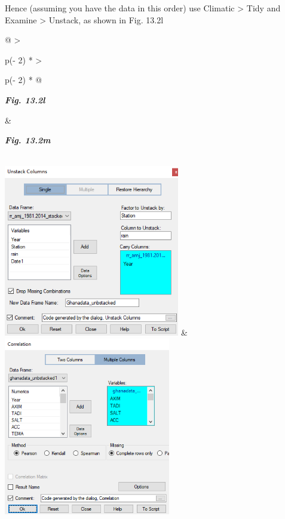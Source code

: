 \documentclass[
  letterpaper,
  DIV=11,
  numbers=noendperiod]{scrreprt}
\begin{document}
Hence (assuming you have the data in this order) use Climatic
\textgreater{} Tidy and Examine \textgreater{} Unstack, as shown in Fig.
13.2l

\begin{longtable}[]{@{}
  >{\raggedright\arraybackslash}p{(\columnwidth - 2\tabcolsep) * }
  >{\raggedright\arraybackslash}p{(\columnwidth - 2\tabcolsep) * }@{}}
\toprule\noalign{}
\begin{minipage}[b]{\linewidth}\raggedright
\textbf{\emph{Fig. 13.2l}}
\end{minipage} & \begin{minipage}[b]{\linewidth}\raggedright
\textbf{\emph{Fig. 13.2m}}
\end{minipage} \\
\midrule\noalign{}
\endhead
\bottomrule\noalign{}
\endlastfoot
\includegraphics[width=3.02457in,height=2.95753in]{figures/Fig13.2l.png}
&
\includegraphics[width=2.8682in,height=3.06266in]{figures/Fig13.2m.png} \\
\end{longtable}
\end{document}
